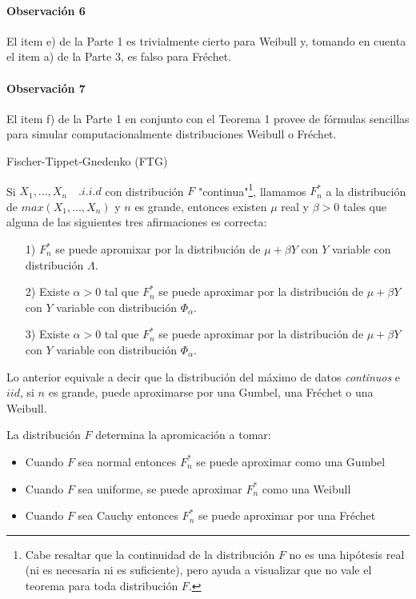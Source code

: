 \documentclass[
  12pt]{article}
\begin{document}
\paragraph*{Observación 6}

El item e) de la Parte 1 es trivialmente cierto para Weibull y, tomando
en cuenta el item a) de la Parte 3, es falso para Fréchet.

\paragraph*{Observación 7}

El item f) de la Parte 1 en conjunto con el Teorema 1 provee de fórmulas
sencillas para simular computacionalmente distribuciones Weibull o
Fréchet.

\begin{theorem} Fischer-Tippet-Gnedenko (FTG)

Si $X_1,...,X_n\quad .i.i.d$ con distribución $F$ "continua"\footnote{Cabe resaltar que la continuidad de la distribución $F$ no es una hipótesis real (ni es necesaria ni es suficiente), pero ayuda a visualizar que no vale el teorema para toda distribución $F$.}, llamamos $F_n^*$ a la distribución de $max(X_1,...,X_n)$ y $n$ es grande, entonces existen $\mu$ real y $\beta>0$ tales que alguna de las siguientes tres afirmaciones es correcta:

\begin{itemize}
  \item[1)] $F_n^*$ se puede apromixar por la distribución de $\mu+\beta Y$ con $Y$ variable con distribución $\Lambda$.
  \item[2)] Existe $\alpha>0$ tal que $F_n^*$ se puede aproximar por la distribución de $\mu+\beta Y$ con $Y$ variable con distribución $\Phi_{\alpha}$. 
  \item[3)] Existe $\alpha>0$ tal que $F_n^*$ se puede aproximar por la distribución de $\mu+\beta Y$ con $Y$ variable con distribución $\Phi_{\alpha}$.
\end{itemize}
\end{theorem}

Lo anterior equivale a decir que la distribución del máximo de datos
\textit{continuos} e \(iid\), si \(n\) es grande, puede aproximarse por
una Gumbel, una Fréchet o una Weibull.

La distribución \(F\) determina la apromicación a tomar:

\begin{itemize}
\item Cuando $F$ sea normal entonces $F_n^*$ se puede aproximar como una Gumbel
\item Cuando $F$ sea uniforme, se puede aproximar $F_n^*$ como una Weibull
\item Cuando $F$ sea Cauchy entonces $F_n^*$ se puede aproximar por una Fréchet
\end{itemize}
\end{document}
